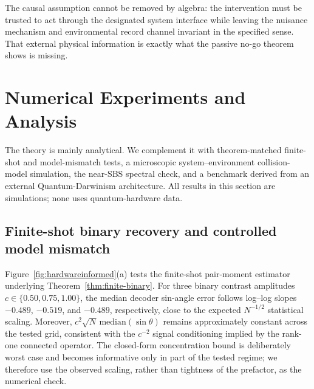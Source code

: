The causal assumption cannot be removed by algebra: the intervention must be trusted to act through the designated system interface while leaving the nuisance mechanism and environmental record channel invariant in the specified sense.  That external physical information is exactly what the passive no-go theorem shows is missing.


\section{Numerical Experiments and Analysis}\label{sec:experiments}
\label{sec:numerics}

The theory is mainly analytical.  We complement it with theorem-matched finite-shot and model-mismatch tests, a microscopic system--environment collision-model simulation, the near-SBS spectral check, and a benchmark derived from an external Quantum-Darwinism architecture.  All results in this section are simulations; none uses quantum-hardware data.

\subsection{Finite-shot binary recovery and controlled model mismatch}

Figure~\ref{fig:hardwareinformed}(a) tests the finite-shot pair-moment estimator underlying Theorem~\ref{thm:finite-binary}.  For three binary contrast amplitudes $c\in\{0.50,0.75,1.00\}$, the median decoder sin-angle error follows log--log slopes $-0.489$, $-0.519$, and $-0.489$, respectively, close to the expected $N^{-1/2}$ statistical scaling.  Moreover, $c^2\sqrt N\,\mathrm{median}(\sin\theta)$ remains approximately constant across the tested grid, consistent with the $c^{-2}$ signal conditioning implied by the rank-one connected operator.  The closed-form concentration bound is deliberately worst case and becomes informative only in part of the tested regime; we therefore use the observed scaling, rather than tightness of the prefactor, as the numerical check.

